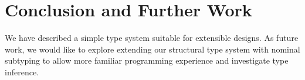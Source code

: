 \section{Conclusion and Further Work}

We have described a simple type system suitable for extensible designs. As
future work, we would like to explore extending our structural type system with
nominal subtyping to allow more familiar programming experience and investigate
type inference.
